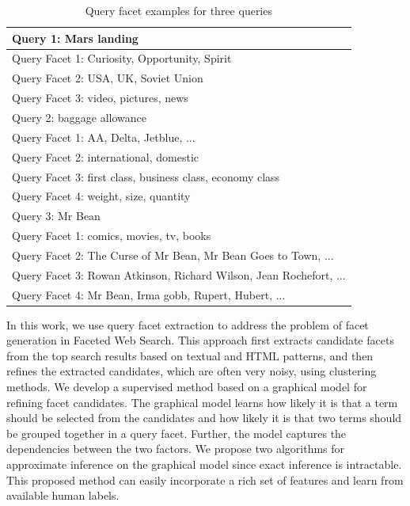 \begin{table}[!ht]
\centering
\caption{Query facet examples for three queries}
\label{tab:facet-facetexample}
\begin{tabular}{|l|} \hline
Query 1: Mars landing \\\hline
Query Facet 1: Curiosity, Opportunity, Spirit \\
Query Facet 2: USA, UK, Soviet Union \\
Query Facet 3: video, pictures, news \\\hhline{|=|}
Query 2: baggage allowance \\\hline
Query Facet 1: AA, Delta, Jetblue,  ... \\
Query Facet 2: international, domestic \\
Query Facet 3: first class, business class, economy class \\
Query Facet 4: weight, size, quantity \\\hhline{|=|}
Query 3: Mr Bean \\\hline
Query Facet 1: comics, movies, tv, books \\
Query Facet 2: The Curse of Mr Bean, Mr Bean Goes to Town, ...\\
Query Facet 3: Rowan Atkinson, Richard Wilson, Jean Rochefort,  ...\\ 
Query Facet 4: Mr Bean, Irma gobb, Rupert, Hubert, ...\\\hline
\end{tabular}
\end{table}


In this work, we use query facet extraction to address the problem of facet generation in Faceted Web Search. This approach first extracts candidate facets from the top search results based on textual and HTML patterns, and then refines the extracted candidates, which are often very noisy, using clustering methods. We develop a supervised method based on a graphical model for refining facet candidates. The graphical model learns how likely it is that a term should be selected from the candidates and how likely it is that two terms should be grouped together in a query facet. Further, the model captures the dependencies between the two factors. We propose two algorithms for approximate inference on the graphical model since  exact inference is intractable. This proposed method can easily incorporate a rich set of features and learn from available human labels.

